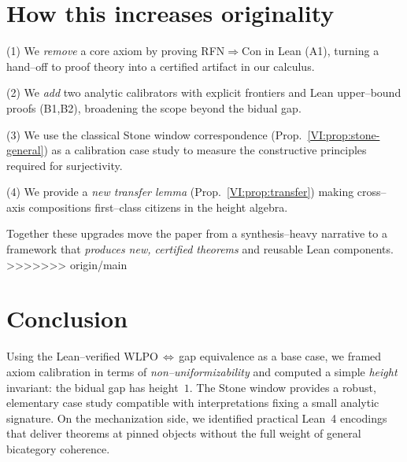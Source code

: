 \documentclass[11pt]{article}
\theoremstyle{definition}
\theoremstyle{remark}
\begin{document}
\section{How this increases originality}

(1) We \emph{remove} a core axiom by proving RFN\(\Rightarrow\)Con in Lean (A1), turning a hand–off to proof theory into a certified artifact in our calculus.

(2) We \emph{add} two analytic calibrators with explicit frontiers and Lean upper–bound proofs (B1,B2), broadening the scope beyond the bidual gap.

(3) We use the classical Stone window correspondence (Prop.~\ref{VI:prop:stone-general}) as a calibration case study to measure the constructive principles required for surjectivity.

(4) We provide a \emph{new transfer lemma} (Prop.~\ref{VI:prop:transfer}) making cross–axis compositions first–class citizens in the height algebra.

Together these upgrades move the paper from a synthesis–heavy narrative to a framework that \emph{produces new, certified theorems} and reusable Lean components.
>>>>>>> origin/main










\section{Conclusion}

Using the Lean–verified WLPO\,$\Leftrightarrow$\,gap equivalence as a base case, we framed axiom calibration in terms of \emph{non--uniformizability} and computed a simple \emph{height} invariant: the bidual gap has height~$1$. The Stone window provides a robust, elementary case study compatible with interpretations fixing a small analytic signature. On the mechanization side, we identified practical Lean~4 encodings that deliver theorems at pinned objects without the full weight of general bicategory coherence. 

\bigskip
\end{document}
